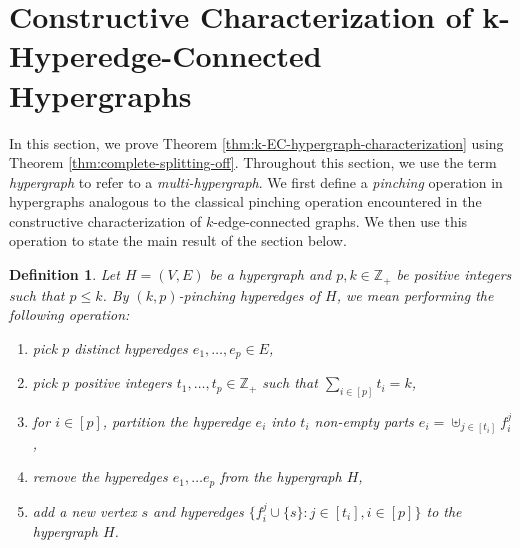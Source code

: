 \documentclass{article}
\def\Cref#1{<#1>}%
\def\({}
\def\){}
\newtheorem{definition}{Definition}[section]
\newcommand{\knote}[1]{{\color{red}[{\tiny Karthik: \bf #1}]\marginpar{\color{red}*}}}
\providecommand{\Z}{\mathbb{Z}}
\begin{document}
\section{Constructive Characterization of \(k\)-Hyperedge-Connected Hypergraphs}
\label{sec:characterizing-k-edge-connected-hypergraphs}
In this section, we prove Theorem \ref{thm:k-EC-hypergraph-characterization} using Theorem \ref{thm:complete-splitting-off}. 
Throughout this section, we use the term \emph{hypergraph} to refer to a \emph{multi-hypergraph}.
\iffalse
We first define a \emph{pinching} operation in hypergraphs analogous to the classical pinching operation encountered in the constructive characterization of $k$-edge-connected graphs. We then use this operation to state the main result of the section below.
\begin{definition}
    Let $H = (V, E)$ be a hypergraph and $p,k \in \Z_+$ be positive integers such that $p \leq k$. By \emph{$(k, p)$-pinching} hyperedges of $H$, we mean performing the following operation:
    \begin{enumerate}
        \item pick $p$ distinct hyperedges $e_1, \ldots, e_p \in E$,
        \item pick $p$ positive integers $t_1, \ldots, t_p \in \Z_+$ such that $\sum_{i \in [p]} t_i = k$,
        \item for $i \in [p]$, partition the hyperedge $e_i$ into $t_i$ non-empty parts $e_i = \uplus_{j \in [t_i]} f_i^j$,
        \item remove the hyperedges $e_1, \ldots e_p$ from the hypergraph $H$,
        \item add a new vertex $s$ and hyperedges $\{f_i^j \cup \{s\} : j \in [t_i], i \in [p]\}$ to the hypergraph $H$.
    \end{enumerate}
\end{definition}
\end{document}
